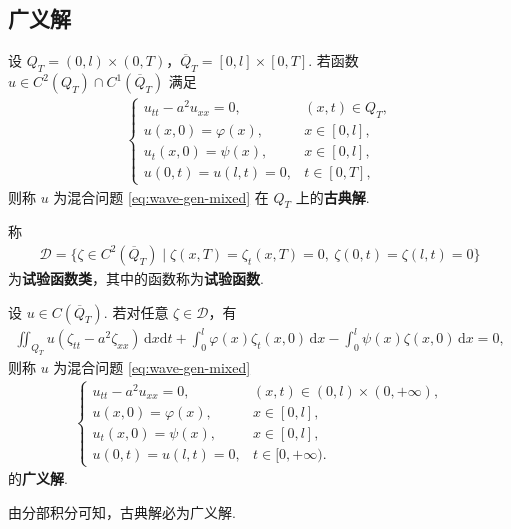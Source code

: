 \documentclass[../../main.tex]{subfiles}%
\begin{document}
\subsection{广义解}

\begin{definition}
设 $Q_T=(0,l)\times(0,T)$，$\overline{Q}_T=[0,l]\times[0,T]$. 若函数 $u\in C^2(Q_T)\cap C^1(\overline{Q}_T)$ 满足
\begin{align}
\begin{cases}
u_{tt}-a^2u_{xx}=0, & (x,t)\in Q_T, \\
u(x,0)=\varphi(x), & x\in[0,l], \\
u_t(x,0)=\psi(x), & x\in[0,l], \\
u(0,t)=u(l,t)=0, & t\in[0,T],
\end{cases} \label{eq:classical-def}
\end{align}
则称 $u$ 为混合问题 \eqref{eq:wave-gen-mixed} 在 $Q_T$ 上的\textbf{古典解}.
\end{definition}

\begin{definition}
称
\begin{align}
\mathcal{D}=\{\zeta\in C^2(\overline{Q}_T)\mid \zeta(x,T)=\zeta_t(x,T)=0,\ \zeta(0,t)=\zeta(l,t)=0\} \label{eq:test-space}
\end{align}
为\textbf{试验函数类}，其中的函数称为\textbf{试验函数}.
\end{definition}

\begin{definition}
设 $u\in C(\overline{Q}_T)$. 若对任意 $\zeta\in\mathcal{D}$，有
\begin{align}
\iint_{Q_T}u(\zeta_{tt}-a^2\zeta_{xx})\,\mathrm{d}x\mathrm{d}t
+\int_0^l\varphi(x)\zeta_t(x,0)\,\mathrm{d}x
-\int_0^l\psi(x)\zeta(x,0)\,\mathrm{d}x=0, \label{eq:weak-form-def}
\end{align}
则称 $u$ 为混合问题 \eqref{eq:wave-gen-mixed}
\begin{align}
\begin{cases}
u_{tt}-a^2u_{xx}=0, & (x,t)\in(0,l)\times(0,+\infty), \\
u(x,0)=\varphi(x), & x\in[0,l], \\
u_t(x,0)=\psi(x), & x\in[0,l], \\
u(0,t)=u(l,t)=0, & t\in[0,+\infty).
\end{cases} \label{eq:wave-gen-mixed}
\end{align}
的\textbf{广义解}.
\end{definition}
\begin{remark}
由分部积分可知，古典解必为广义解.
\end{remark}
\end{document}
